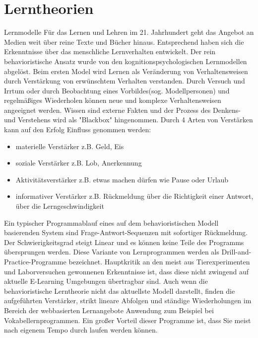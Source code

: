 \documentclass[a4paper, 12pt, twoside, BCOR=20mm, DIV=calc, abstracton, parskip=half*, toc=bibliography, toc=listof, headsepline, footsepline, headings=small, numbers=enddot]{scrreprt}
\begin{document}
\section{Lerntheorien}
{Lernmodelle}\newline
Für das Lernen und Lehren im 21. Jahrhundert geht das Angebot an Medien weit über reine Texte und Bücher hinaus. Entsprechend haben sich die Erkenntnisse über das menschliche Lernverhalten entwickelt. Der rein behavioristische Ansatz \cite[John Watson/ B.F.Skinner]{baumgart1998entwicklungs} wurde von den kognitionspsychologischen Lernmodellen \cite[S.102]{arnold2013handbuch}abgelöst. Beim ersten Model wird Lernen als Veränderung von Verhaltensweisen durch Verstärkung von erwünschtem Verhalten verstanden. Durch Versuch und Irrtum oder durch Beobachtung eines Vorbildes(sog. Modellpersonen) und regelmäßiges Wiederholen können neue und komplexe Verhaltensweisen angeeignet werden\cite[S.101 Skinner]{arnold2013handbuch}. Wissen sind externe Fakten und der Prozess des Denkens- und Verstehens wird als "Blackbox" hingenommen. 
Durch 4 Arten von Verstärken kann auf den Erfolg Einfluss genommen werden: 
\begin{itemize}
\item materielle Verstärker z.B. Geld, Eis
\item soziale Verstärker z.B. Lob, Anerkennung
\item Aktivitätsverstärker z.B. etwas machen dürfen wie Pause oder Urlaub
\item informativer Verstärker z.B. Rückmeldung über die Richtigkeit einer Antwort, über die Lerngeschwindigkeit
\end{itemize}\cite[S.21]{issing2009online}
Ein typischer Programmablauf eines auf dem behavioristischen Modell basierenden System sind Frage-Antwort-Sequenzen mit sofortiger Rückmeldung. Der Schwierigkeitsgrad steigt Linear und es können keine Teile des Programms übersprungen werden. Diese Variante von Lernprogrammen werden als Drill-and-Practice-Programme bezeichnet. Hauptkritik an den meist aus Tierexperimenten und Laborversuchen gewonnenen Erkenntnisse ist, dass diese nicht zwingend auf aktuelle E-Learning Umgebungen übertragbar sind.
Auch wenn die behavioristische Lerntheorie nicht das aktuellste Modell darstellt, finden die aufgeführten Verstärker, strikt lineare Abfolgen und ständige Wiederholungen im Bereich der webbasierten Lernangebote Anwendung zum Beispiel bei Vokabellernprogrammen. Ein großer Vorteil dieser Programme ist, dass Sie meist nach eigenem Tempo durch laufen werden können\cite[65 ff.]{niegemann2005}. 
\end{document}
